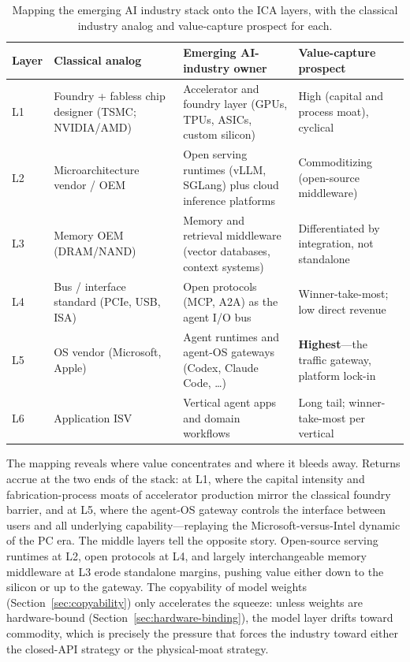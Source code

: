 \begin{table}[h]
\centering
\footnotesize
\caption{Mapping the emerging AI industry stack onto the ICA layers, with the classical industry analog and value-capture prospect for each.}
\label{tab:industry-layers}
\begin{tabularx}{\textwidth}{>{\raggedright\arraybackslash}p{}>{\raggedright\arraybackslash}p{}>{\raggedright\arraybackslash}p{}>{\raggedright\arraybackslash}p{}}
\toprule
\textbf{Layer} & \textbf{Classical analog} & \textbf{Emerging AI-industry owner} & \textbf{Value-capture prospect} \\
\midrule
L1 & Foundry + fabless chip designer (TSMC; NVIDIA/AMD) & Accelerator and foundry layer (GPUs, TPUs, ASICs, custom silicon) & High (capital and process moat), cyclical \\
L2 & Microarchitecture vendor / OEM & Open serving runtimes (vLLM, SGLang) plus cloud inference platforms & Commoditizing (open-source middleware) \\
L3 & Memory OEM (DRAM/NAND) & Memory and retrieval middleware (vector databases, context systems) & Differentiated by integration, not standalone \\
L4 & Bus / interface standard (PCIe, USB, ISA) & Open protocols (MCP, A2A) as the agent I/O bus & Winner-take-most; low direct revenue \\
L5 & OS vendor (Microsoft, Apple) & Agent runtimes and agent-OS gateways (Codex, Claude Code, \ldots) & \textbf{Highest}---the traffic gateway, platform lock-in \\
L6 & Application ISV & Vertical agent apps and domain workflows & Long tail; winner-take-most per vertical \\
\bottomrule
\end{tabularx}
\end{table}

The mapping reveals where value concentrates and where it bleeds away. Returns accrue at the two ends of the stack: at L1, where the capital intensity and fabrication-process moats of accelerator production mirror the classical foundry barrier, and at L5, where the agent-OS gateway controls the interface between users and all underlying capability---replaying the Microsoft-versus-Intel dynamic of the PC era. The middle layers tell the opposite story. Open-source serving runtimes at L2, open protocols at L4, and largely interchangeable memory middleware at L3 erode standalone margins, pushing value either down to the silicon or up to the gateway. The copyability of model weights (Section~\ref{sec:copyability}) only accelerates the squeeze: unless weights are hardware-bound (Section~\ref{sec:hardware-binding}), the model layer drifts toward commodity, which is precisely the pressure that forces the industry toward either the closed-API strategy or the physical-moat strategy.

